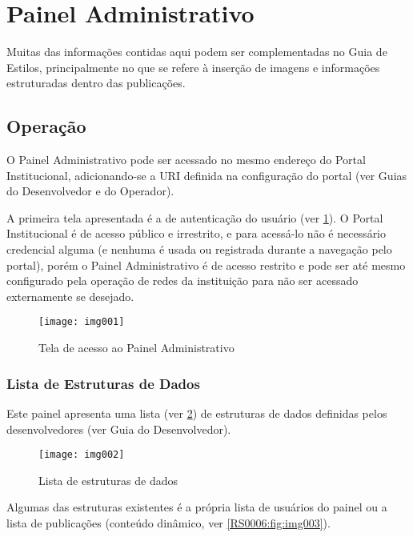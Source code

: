 \section{Painel Administrativo}\label{RS0006:introducao}

\begin{displayquote}
    Muitas das informações contidas aqui podem ser complementadas no Guia de Estilos, principalmente no que se refere à inserção de imagens e informações estruturadas dentro das publicações.
\end{displayquote}

\subsection{Operação}

O Painel Administrativo pode ser acessado no mesmo endereço do Portal Institucional, adicionando-se a \gls{URI} definida na configuração do portal (ver Guias do Desenvolvedor e do Operador).

A primeira tela apresentada é a de autenticação do usuário (ver \cref{RS0006:fig:img001}). O Portal Institucional é de acesso público e irrestrito, e para acessá-lo não é necessário credencial alguma (e nenhuma é usada ou registrada durante a navegação pelo portal), porém o Painel Administrativo é de acesso restrito e pode ser até mesmo configurado pela operação de redes da instituição para não ser acessado externamente se desejado.

\begin{figure}[!ht]
    \centering
    \texttt{[image: img001]}
    \caption{Tela de acesso ao Painel Administrativo}\label{RS0006:fig:img001}
\end{figure}

\subsubsection{Lista de Estruturas de Dados}

Este painel apresenta uma lista (ver \cref{RS0006:fig:img002}) de estruturas de dados definidas pelos desenvolvedores (ver Guia do Desenvolvedor).

\begin{figure}[!ht]
    \centering
    \texttt{[image: img002]}
    \caption{Lista de estruturas de dados}\label{RS0006:fig:img002}
\end{figure}

Algumas das estruturas existentes é a própria lista de usuários do painel ou a lista de publicações (conteúdo dinâmico, ver \cref{RS0006:fig:img003}).

